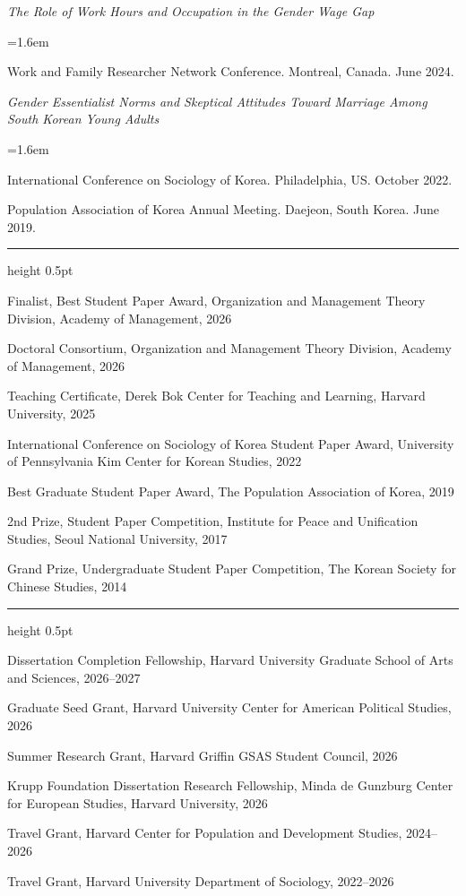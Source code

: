 \documentclass[11pt,letterpaper]{article}
\newcommand{\cvneed}[1]{%
  \par
  \ifdim\pagegoal=\maxdimen\else
    \cvroom=\dimexpr\pagegoal-\pagetotal\relax
    \ifdim\cvroom<#1\relax\newpage\fi
  \fi}
\newcommand{\cvsection}[1]{%
  \par\addvspace{1.15em}%
  \cvneed{4\baselineskip}%
  \noindent{\small\bfseries\textls{\MakeUppercase{#1}}}\par
  \vspace{0.25em}%
  {\color{rulegray}\hrule height 0.5pt}%
  \vspace{0.55em}%
  \nobreak\ignorespaces}
\newenvironment{sublines}{%
  \par\nobreak
  \begingroup
  \small
  \RaggedRight
  \leftskip=1.6em
  \setlength{\parskip}{0.32em}\setlength{\parindent}{0pt}%
}{\par\endgroup\vspace{0.2em}}
\newcommand{\entry}[1]{\par\addvspace{0.85em}\cvneed{3\baselineskip}\noindent #1\par\nobreak}
\begin{document}
\entry{\textit{The Role of Work Hours and Occupation in the Gender Wage Gap}}
\begin{sublines}
Work and Family Researcher Network Conference. Montreal, Canada. June 2024.
\end{sublines}

\entry{\textit{Gender Essentialist Norms and Skeptical Attitudes Toward Marriage Among South Korean Young Adults}}
\begin{sublines}
International Conference on Sociology of Korea. Philadelphia, US. October 2022.

Population Association of Korea Annual Meeting. Daejeon, South Korea. June 2019.
\end{sublines}

\cvsection{Honors \& awards}
Finalist, Best Student Paper Award, Organization and Management Theory Division, Academy of Management, 2026

Doctoral Consortium, Organization and Management Theory Division, Academy of Management, 2026

Teaching Certificate, Derek Bok Center for Teaching and Learning, Harvard University, 2025

International Conference on Sociology of Korea Student Paper Award, University of Pennsylvania Kim Center for Korean Studies, 2022

Best Graduate Student Paper Award, The Population Association of Korea, 2019

2nd Prize, Student Paper Competition, Institute for Peace and Unification Studies, Seoul National University, 2017

Grand Prize, Undergraduate Student Paper Competition, The Korean Society for Chinese Studies, 2014

\cvsection{Fellowships \& grants}
Dissertation Completion Fellowship, Harvard University Graduate School of Arts and Sciences, 2026--2027

Graduate Seed Grant, Harvard University Center for American Political Studies, 2026

Summer Research Grant, Harvard Griffin GSAS Student Council, 2026

Krupp Foundation Dissertation Research Fellowship, Minda de Gunzburg Center for European Studies, Harvard University, 2026

Travel Grant, Harvard Center for Population and Development Studies, 2024--2026

Travel Grant, Harvard University Department of Sociology, 2022--2026
\end{document}

